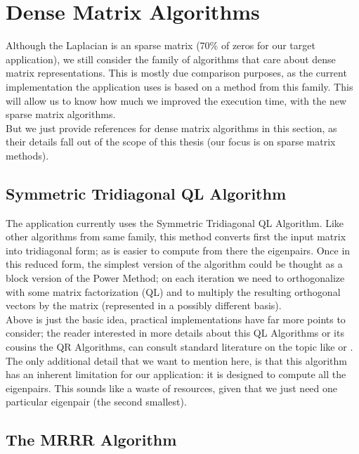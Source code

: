 \section{Dense Matrix Algorithms}

Although the Laplacian is an sparse matrix (70\% of zeros for our
target application), we still consider the family of algorithms that
care about dense matrix representations. This is mostly due comparison
purposes, as the current implementation the application uses is
based on a method from this family. This will allow us to know how
much we improved the execution time, with the new sparse matrix
algorithms. \\

But we just provide references for 
dense matrix algorithms in this section, as their details fall out of the scope of
this thesis (our focus is on sparse matrix methods). \\

\subsection{Symmetric Tridiagonal QL Algorithm}
The application currently uses the Symmetric Tridiagonal QL
Algorithm. Like other algorithms from same family, this method
converts first the input matrix into tridiagonal form; as is easier to
compute from there the eigenpairs. Once in this reduced form, the
simplest version of the algorithm could be thought as a block
version of the Power Method; on each iteration we need to
orthogonalize with some matrix factorization (QL) and to multiply the
resulting orthogonal vectors by the matrix (represented in a possibly
different basis). \\

Above is just the basic idea, practical implementations have far
more points to consider; the reader interested in more details about
this QL Algorithms or its cousins the QR Algorithms, can consult
standard literature on the topic like \cite{golub13} or
\cite{parlett80}. The only additional detail that we want to mention
here, is that this algorithm has an inherent limitation for our
application: it is designed to compute all the eigenpairs. This sounds
like a waste of resources, given that we just need one particular
eigenpair (the second smallest). 

\subsection{The MRRR Algorithm}

